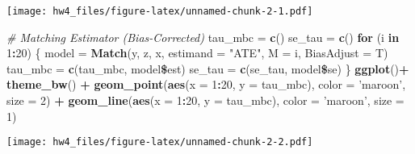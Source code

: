 \documentclass[]{article}
\newenvironment{Shaded}{\begin{snugshade}}{\end{snugshade}}
\newcommand{\KeywordTok}[1]{\textcolor[rgb]{0.13,0.29,0.53}{\textbf{#1}}}
\newcommand{\DataTypeTok}[1]{\textcolor[rgb]{0.13,0.29,0.53}{#1}}
\newcommand{\DecValTok}[1]{\textcolor[rgb]{0.00,0.00,0.81}{#1}}
\newcommand{\StringTok}[1]{\textcolor[rgb]{0.31,0.60,0.02}{#1}}
\newcommand{\CommentTok}[1]{\textcolor[rgb]{0.56,0.35,0.01}{\textit{#1}}}
\newcommand{\ControlFlowTok}[1]{\textcolor[rgb]{0.13,0.29,0.53}{\textbf{#1}}}
\newcommand{\OperatorTok}[1]{\textcolor[rgb]{0.81,0.36,0.00}{\textbf{#1}}}
\newcommand{\NormalTok}[1]{#1}
\begin{document}
\texttt{[image: hw4\_files/figure-latex/unnamed-chunk-2-1.pdf]}

\begin{Shaded}
\begin{Highlighting}[]
\CommentTok{# Matching Estimator (Bias-Corrected)}
\NormalTok{tau_mbc =}\StringTok{ }\KeywordTok{c}\NormalTok{()}
\NormalTok{se_tau =}\StringTok{ }\KeywordTok{c}\NormalTok{()}
\ControlFlowTok{for}\NormalTok{ (i }\ControlFlowTok{in} \DecValTok{1}\OperatorTok{:}\DecValTok{20}\NormalTok{)}
\NormalTok{\{}
\NormalTok{  model =}\StringTok{ }\KeywordTok{Match}\NormalTok{(y, z, x, }\DataTypeTok{estimand =} \StringTok{"ATE"}\NormalTok{, }\DataTypeTok{M =}\NormalTok{ i, }\DataTypeTok{BiasAdjust =}\NormalTok{ T)}
\NormalTok{  tau_mbc =}\StringTok{ }\KeywordTok{c}\NormalTok{(tau_mbc, model}\OperatorTok{\$}\NormalTok{est)}
\NormalTok{  se_tau =}\StringTok{ }\KeywordTok{c}\NormalTok{(se_tau, model}\OperatorTok{\$}\NormalTok{se)}
\NormalTok{\}}
\KeywordTok{ggplot}\NormalTok{()}\OperatorTok{+}
\StringTok{  }\KeywordTok{theme_bw}\NormalTok{() }\OperatorTok{+}
\StringTok{  }\KeywordTok{geom_point}\NormalTok{(}\KeywordTok{aes}\NormalTok{(}\DataTypeTok{x =} \DecValTok{1}\OperatorTok{:}\DecValTok{20}\NormalTok{, }\DataTypeTok{y =}\NormalTok{ tau_mbc), }\DataTypeTok{color =} \StringTok{'maroon'}\NormalTok{, }\DataTypeTok{size =} \DecValTok{2}\NormalTok{) }\OperatorTok{+}
\StringTok{  }\KeywordTok{geom_line}\NormalTok{(}\KeywordTok{aes}\NormalTok{(}\DataTypeTok{x =} \DecValTok{1}\OperatorTok{:}\DecValTok{20}\NormalTok{, }\DataTypeTok{y =}\NormalTok{ tau_mbc), }\DataTypeTok{color =} \StringTok{'maroon'}\NormalTok{, }\DataTypeTok{size =} \DecValTok{1}\NormalTok{)}
\end{Highlighting}
\end{Shaded}

\texttt{[image: hw4\_files/figure-latex/unnamed-chunk-2-2.pdf]}
\end{document}
